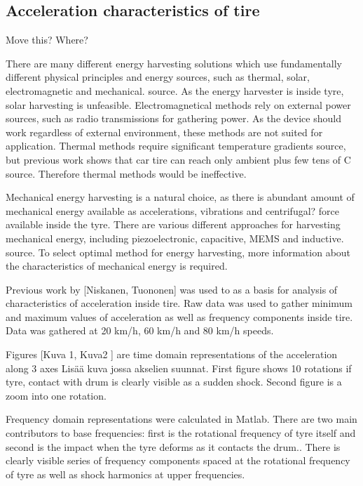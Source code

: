\subsection{Acceleration characteristics of tire}
{\color{blue} Move this? Where?

There are many different energy harvesting solutions which use fundamentally different physical principles and energy sources, such as thermal, solar, electromagnetic and mechanical. {\color{red} source}. As the energy harvester is inside tyre, solar harvesting is unfeasible. Electromagnetical methods rely on external power sources, such as radio transmissions for gathering power. As the device should work regardless of external environment, these methods are not suited for application. Thermal methods require significant temperature gradients {\color{red} source}, but previous work shows that car tire can reach only ambient plus few tens of \degree C {\color{red} source}. Therefore thermal methods would be ineffective. 

Mechanical energy harvesting is a natural choice, as there is abundant amount of mechanical energy available as accelerations, vibrations and centrifugal{\color{red}?} force available inside the tyre. There are various different approaches for harvesting mechanical energy, including piezoelectronic, capacitive, MEMS and inductive. {\color{red} source}. To select optimal method for energy harvesting, more information about the characteristics of mechanical energy is required.}

Previous work by {\color{red}[Niskanen, Tuononen]} was used to as a basis for analysis of characteristics of acceleration inside tire. Raw data was used to gather minimum and maximum values of acceleration as well as frequency components inside tire. Data was gathered at 20 km/h, 60 km/h and 80 km/h speeds. 

Figures {\color{red}[Kuva 1, Kuva2 ]} are time domain representations of the acceleration along 3 axes {\color{red}Lis\"a\"a kuva jossa akselien suunnat}. First figure shows 10 rotations if tyre, contact with drum is clearly visible as a sudden shock. Second figure is a zoom into one rotation.

Frequency domain representations were calculated in Matlab. There are two main contributors to base frequencies: first is the rotational frequency of tyre itself and second is the impact when the tyre deforms as it contacts the drum.. There is clearly visible series of frequency components spaced at the rotational frequency of tyre as well as shock harmonics at upper frequencies. 

